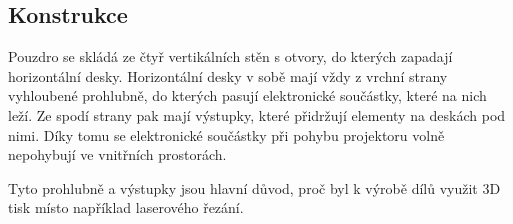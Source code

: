 \subsection{Konstrukce}
Pouzdro se skládá ze čtyř vertikálních stěn s otvory, do kterých zapadají horizontální desky. Horizontální desky v sobě mají vždy z vrchní strany vyhloubené prohlubně, do kterých pasují elektronické součástky, které na nich leží. Ze spodí strany pak mají výstupky, které přidržují elementy na deskách pod nimi. Díky tomu se elektronické součástky při pohybu projektoru volně nepohybují ve vnitřních prostorách.

Tyto prohlubně a výstupky jsou hlavní důvod, proč byl k výrobě dílů využit 3D tisk místo například laserového řezání.




